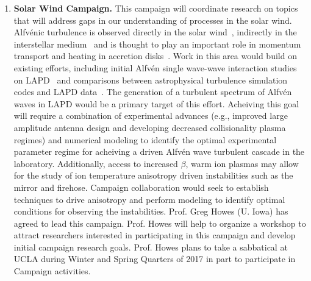 \documentclass[11pt]{article}
\renewcommand{\cite}{\citep}
\begin{document}
\begin{enumerate}
\item {\bfseries Solar Wind Campaign.} This campaign will
  coordinate research on topics that will address gaps in our
  understanding of processes in the solar wind.  Alfv\'{e}nic
  turbulence is observed directly in the solar wind~\cite{bale05,alexandrova08},
  indirectly in the interstellar medium~\cite{armstrong95} and is thought to play
  an important role in momentum transport and heating in accretion
  disks~\cite{balbus98}.  Work in this area would build on existing efforts,
  including initial Alfvén single wave-wave interaction studies on
  LAPD~\cite{carter:2006,auerbach:2010,auerbach:2011,dorfman:2013,} and comparisons between astrophysical
  turbulence simulation codes and LAPD data~\cite{nielson:2010,howes:2012,howes:2013}.  The generation
  of a turbulent spectrum of Alfv\'{e}n waves in LAPD would be a
  primary target of this effort.  Acheiving this goal will require a
  combination of experimental advances (e.g., improved large amplitude
  antenna design and developing decreased collisionality plasma regimes) and
  numerical modeling to identify the optimal experimental parameter
  regime for acheiving a driven Alfv\'{e}n wave turbulent cascade in
  the laboratory.  Additionally, access to increased $\beta$, warm ion
  plasmas may allow for the study of ion temperature anisotropy driven
  instabilities such as the mirror and firehose.  Campaign
  collaboration would seek to establish techniques to drive anisotropy
  and perform modeling to identify optimal conditions for observing
  the instabilities.  Prof. Greg Howes (U. Iowa) has agreed to
  lead this campaign.  Prof. Howes will help to organize a workshop to
  attract researchers interested in participating in this campaign and
  develop initial campaign research goals.  Prof. Howes plans to take
  a sabbatical at UCLA during Winter and Spring Quarters of 2017 in
  part to participate in Campaign activities.  


\end{enumerate}
\end{document}
